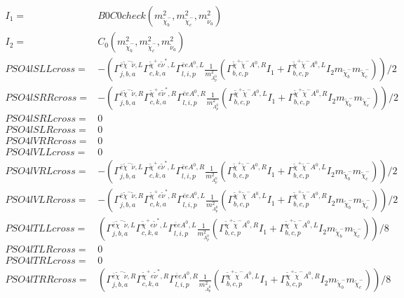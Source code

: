 \documentclass[A4,landscape]{article}
\begin{document}
\begin{align} 
I_1= & B0C0check(m^2_{\tilde{\chi}^-_{{b}}}, m^2_{\tilde{\chi}^-_{{c}}}, m^2_{\tilde{\nu}_{{a}}}) \\ 
I_2= & C_0(m^2_{\tilde{\chi}^-_{{b}}}, m^2_{\tilde{\chi}^-_{{c}}}, m^2_{\tilde{\nu}_{{a}}}) \\ 
  PSO4lSLLcross= & -( \Gamma^{\bar{e}\tilde{\chi}^- \tilde{\nu} ,L}_{j, b, a} \Gamma^{\tilde{\chi}^+e \tilde{\nu}^*,L}_{c, k, a} \Gamma^{\bar{e}e A^0 ,L}_{l, i, p} \frac{1}{m^2_{A^0_{{p}}}} (\Gamma^{\tilde{\chi}^+\tilde{\chi}^- A^0 ,R}_{b, c, p} I_1 + \Gamma^{\tilde{\chi}^+\tilde{\chi}^- A^0 ,L}_{b, c, p} I_2 m_{\tilde{\chi}^-_{{b}}} m_{\tilde{\chi}^-_{{c}}}))/2 \\ 
  PSO4lSRRcross= & -( \Gamma^{\bar{e}\tilde{\chi}^- \tilde{\nu} ,R}_{j, b, a} \Gamma^{\tilde{\chi}^+e \tilde{\nu}^*,R}_{c, k, a} \Gamma^{\bar{e}e A^0 ,R}_{l, i, p} \frac{1}{m^2_{A^0_{{p}}}} (\Gamma^{\tilde{\chi}^+\tilde{\chi}^- A^0 ,L}_{b, c, p} I_1 + \Gamma^{\tilde{\chi}^+\tilde{\chi}^- A^0 ,R}_{b, c, p} I_2 m_{\tilde{\chi}^-_{{b}}} m_{\tilde{\chi}^-_{{c}}}))/2 \\ 
  PSO4lSRLcross= & 0 \\ 
  PSO4lSLRcross= & 0 \\ 
  PSO4lVRRcross= & 0 \\ 
  PSO4lVLLcross= & 0 \\ 
  PSO4lVRLcross= & -( \Gamma^{\bar{e}\tilde{\chi}^- \tilde{\nu} ,L}_{j, b, a} \Gamma^{\tilde{\chi}^+e \tilde{\nu}^*,L}_{c, k, a} \Gamma^{\bar{e}e A^0 ,R}_{l, i, p} \frac{1}{m^2_{A^0_{{p}}}} (\Gamma^{\tilde{\chi}^+\tilde{\chi}^- A^0 ,R}_{b, c, p} I_1 + \Gamma^{\tilde{\chi}^+\tilde{\chi}^- A^0 ,L}_{b, c, p} I_2 m_{\tilde{\chi}^-_{{b}}} m_{\tilde{\chi}^-_{{c}}}))/2 \\ 
  PSO4lVLRcross= & -( \Gamma^{\bar{e}\tilde{\chi}^- \tilde{\nu} ,R}_{j, b, a} \Gamma^{\tilde{\chi}^+e \tilde{\nu}^*,R}_{c, k, a} \Gamma^{\bar{e}e A^0 ,L}_{l, i, p} \frac{1}{m^2_{A^0_{{p}}}} (\Gamma^{\tilde{\chi}^+\tilde{\chi}^- A^0 ,L}_{b, c, p} I_1 + \Gamma^{\tilde{\chi}^+\tilde{\chi}^- A^0 ,R}_{b, c, p} I_2 m_{\tilde{\chi}^-_{{b}}} m_{\tilde{\chi}^-_{{c}}}))/2 \\ 
  PSO4lTLLcross= & ( \Gamma^{\bar{e}\tilde{\chi}^- \tilde{\nu} ,L}_{j, b, a} \Gamma^{\tilde{\chi}^+e \tilde{\nu}^*,L}_{c, k, a} \Gamma^{\bar{e}e A^0 ,L}_{l, i, p} \frac{1}{m^2_{A^0_{{p}}}} (\Gamma^{\tilde{\chi}^+\tilde{\chi}^- A^0 ,R}_{b, c, p} I_1 + \Gamma^{\tilde{\chi}^+\tilde{\chi}^- A^0 ,L}_{b, c, p} I_2 m_{\tilde{\chi}^-_{{b}}} m_{\tilde{\chi}^-_{{c}}}))/8 \\ 
  PSO4lTLRcross= & 0 \\ 
  PSO4lTRLcross= & 0 \\ 
  PSO4lTRRcross= & ( \Gamma^{\bar{e}\tilde{\chi}^- \tilde{\nu} ,R}_{j, b, a} \Gamma^{\tilde{\chi}^+e \tilde{\nu}^*,R}_{c, k, a} \Gamma^{\bar{e}e A^0 ,R}_{l, i, p} \frac{1}{m^2_{A^0_{{p}}}} (\Gamma^{\tilde{\chi}^+\tilde{\chi}^- A^0 ,L}_{b, c, p} I_1 + \Gamma^{\tilde{\chi}^+\tilde{\chi}^- A^0 ,R}_{b, c, p} I_2 m_{\tilde{\chi}^-_{{b}}} m_{\tilde{\chi}^-_{{c}}}))/8 \\ 
\end{align} 
\end{document}
